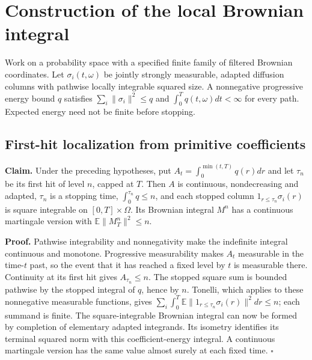 \documentclass[11pt,a4paper]{report}
\begin{document}
\section{\texorpdfstring{Construction of the local Brownian integral}{Construction of the local Brownian integral}}


Work on a probability space with a specified finite family of filtered Brownian coordinates. Let \(\sigma_i(t,\omega)\) be jointly strongly measurable, adapted diffusion columns with pathwise locally integrable squared size. A nonnegative progressive energy bound \(q\) satisfies \(\sum_i\|\sigma_i\|^2\le q\) and \(\int_0^Tq(t,\omega)dt<\infty\) for every path. Expected energy need not be finite before stopping.

\subsection{\texorpdfstring{First-hit localization from primitive coefficients}{First-hit localization from primitive coefficients}}


\textbf{Claim.} Under the preceding hypotheses, put \(A_t=\int_0^{\min(t,T)}q(r)dr\) and let \(\tau_n\) be its first hit of level \(n\), capped at \(T\). Then \(A\) is continuous, nondecreasing and adapted, \(\tau_n\) is a stopping time, \(\int_0^{\tau_n}q\le n\), and each stopped column \(1_{r\le\tau_n}\sigma_i(r)\) is square integrable on \([0,T]\times\Omega\). Its Brownian integral \(M^n\) has a continuous martingale version with \(\mathbb E\|M_T^n\|^2\le n\).



\textbf{Proof.} Pathwise integrability and nonnegativity make the indefinite integral continuous and monotone. Progressive measurability makes \(A_t\) measurable in the time-\(t\) past, so the event that it has reached a fixed level by \(t\) is measurable there. Continuity at its first hit gives \(A_{\tau_n}\le n\). The stopped square sum is bounded pathwise by the stopped integral of \(q\), hence by \(n\). Tonelli, which applies to these nonnegative measurable functions, gives \(\sum_i\int_0^T\mathbb E\|1_{r\le\tau_n}\sigma_i(r)\|^2dr\le n\); each summand is finite. The square-integrable Brownian integral can now be formed by completion of elementary adapted integrands. Its isometry identifies its terminal squared norm with this coefficient-energy integral. A continuous martingale version has the same value almost surely at each fixed time. \(\square\)
\end{document}
